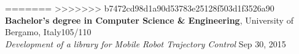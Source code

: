 \documentclass[10pt]{article}
\newcommand{\cvsection}[1]{\section*{\centering\normalsize\uppercase{#1}}\vspace{-16pt}\rule{\linewidth}{0.2pt}\vspace{6pt}}
\begin{document}
=======
\vspace{-6pt}
>>>>>>> b7472cd98d1a90d53783e25128f503d1f3526a90
\textbf{Bachelor's degree in Computer Science \& Engineering}, University of Bergamo, Italy\hfill 105\slash110\\
\textit{Development of a library for Mobile Robot Trajectory Control} \hfill Sep 30, 2015\\
\end{document}
